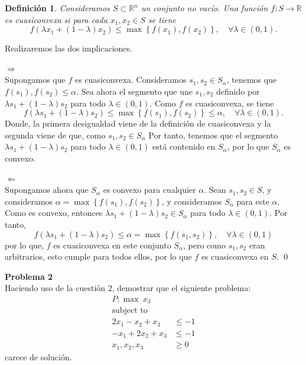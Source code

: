 \documentclass[a4paper]{article}
\newenvironment{problem}[2][Problema]
    { \begin{mdframed}[backgroundcolor=gray!20] \textbf{#1 #2} \\}
    {  \end{mdframed}}
\newcommand{\R}{\mathbb R}
\newtheorem{ndef}{Definición}
\begin{document}
\begin{ndef}
  Consideramos \(S \subset \R^{n}\) un conjunto no vacío. Una función \(f:S\to \R\) es cuasiconvexa si para cada \(x_{1},x_{2} \in S\) se tiene
  \[
    f(\lambda x_{1} + (1-\lambda)x_{2}) \leq \max \left\{f(x_{1}), f(x_{2})\right\}, \quad \forall \lambda \in (0,1).
  \]
\end{ndef}

Realizaremos las dos implicaciones.

\(\boxed{\Rightarrow}\)\\

Supongamos que \(f\) es cuasiconvexa. Consideramos \(s_{1},s_{2} \in S_{\alpha}\), tenemos que \(f(s_{1}), f(s_{2}) \leq \alpha\). Sea ahora el segmento que une \(s_{1},s_{2}\) definido por \(\lambda s_{1} + (1-\lambda)s_{2}\) para todo \(\lambda \in (0,1)\). Como \(f\) es cuasiconvexa, se tiene
\[
f\left(\lambda s_{1} + (1-\lambda)s_{2}\right) \leq \max \left\{ f\left(s_{1}\right),f\left(s_{2}\right)\right\} \leq \alpha, \quad \forall \lambda \in (0,1).
\]
Donde, la primera desigualdad viene de la definición de cuasiconvexa y la segunda viene de que, como \(s_{1},s_{2} \in S_{\alpha}\)
Por tanto, tenemos que el segmento \(\lambda s_{1} + (1-\lambda)s_{2}\) para todo \(\lambda \in (0,1)\) está contenido en \( S_{\alpha}\), por lo que \(S_{\alpha}\) es convexo.

\(\boxed{\Leftarrow}\)\\
Supongamos ahora que \(S_{\alpha}\) es convexo para cualquier \(\alpha\). Sean \(s_{1},s_{2} \in S\), y consideramos \(\alpha = \max \left\{f(s_{1}),f(s_{2}) \right\}\), y consideramos \(S_{\alpha}\) para este \(\alpha\). Como es convexo, entonces \(\lambda s_{1} + (1-\lambda)s_{2} \in S_{\alpha}\) para todo \(\lambda \in (0,1)\). Por tanto,
\[
f(\lambda s_{1} + (1-\lambda)s_{2}) \leq \alpha = \max \left\{f(s_{1},s_{2})\right\}, \quad \forall \lambda \in (0,1)
\]
por lo que, \(f\) es cuasiconvexa en este conjunto \(S_{\alpha}\), pero como \(s_{1},s_{2}\) eran arbitrarios, esto cumple para todos ellos, por lo que \(f\) es cuasiconvexa en \(S\). \qed



\begin{problem}{2}
Haciendo uso de la cuestión 2, demostrar que el siguiente problema:
\begin{align*}
 P: \max\ x_3 &\\
 \text{subject to}\\
 2x_1 - x_2 + x_3 & \leq -1\\
 -x_1 + 2x_2 + x_3 & \leq -1\\
 x_1,x_2,x_3 & \geq 0
\end{align*}
carece de solución.
\end{problem}
\end{document}
